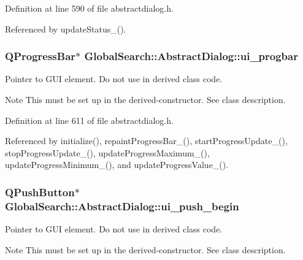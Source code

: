 Definition at line 590 of file abstractdialog.\-h.



Referenced by update\-Status\-\_\-().

\hypertarget{classGlobalSearch_1_1AbstractDialog_a9b91400d03e9c7f3e94bf6b1f91bb97a}{
\subsubsection[{ui\-\_\-progbar}]{\setlength{\rightskip}{0pt plus 5cm}Q\-Progress\-Bar$\ast$ Global\-Search\-::\-Abstract\-Dialog\-::ui\-\_\-progbar\hspace{0.3cm}{\ttfamily [protected]}}}\label{classGlobalSearch_1_1AbstractDialog_a9b91400d03e9c7f3e94bf6b1f91bb97a}
Pointer to G\-U\-I element. Do not use in derived class code. \begin{DoxyNote}{Note}
This must be set up in the derived-\/constructor. See class description. 
\end{DoxyNote}


Definition at line 611 of file abstractdialog.\-h.



Referenced by initialize(), repaint\-Progress\-Bar\-\_\-(), start\-Progress\-Update\-\_\-(), stop\-Progress\-Update\-\_\-(), update\-Progress\-Maximum\-\_\-(), update\-Progress\-Minimum\-\_\-(), and update\-Progress\-Value\-\_\-().

\hypertarget{classGlobalSearch_1_1AbstractDialog_a526c9ad4ea52454ba41be74de24cdd6c}{
\subsubsection[{ui\-\_\-push\-\_\-begin}]{\setlength{\rightskip}{0pt plus 5cm}Q\-Push\-Button$\ast$ Global\-Search\-::\-Abstract\-Dialog\-::ui\-\_\-push\-\_\-begin\hspace{0.3cm}{\ttfamily [protected]}}}\label{classGlobalSearch_1_1AbstractDialog_a526c9ad4ea52454ba41be74de24cdd6c}
Pointer to G\-U\-I element. Do not use in derived class code. \begin{DoxyNote}{Note}
This must be set up in the derived-\/constructor. See class description. 
\end{DoxyNote}


